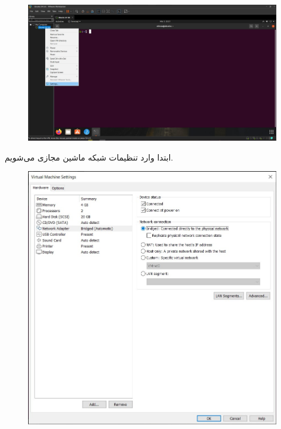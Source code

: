 \documentclass{article}
\begin{document}
\subsection{}
\begin{figure}[H]
    \centering
    \includegraphics[width=1.0\textwidth]{figures/2a.jpg}
    \caption
	{
	}
    \label{fig:fig1}
\end{figure}
ابتدا وارد تنظیمات شبکه ماشین مجازی می‌شویم.
\begin{figure}[H]
    \centering
    \includegraphics[width=1.0\textwidth]{figures/2b.jpg}
    \caption
	{
	}
    \label{fig:fig1}
\end{figure}
\end{document}
